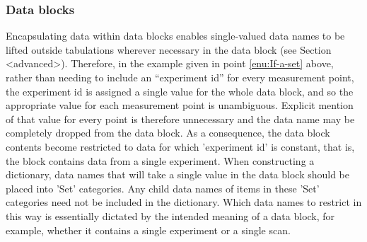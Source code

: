 \subsubsection{\label{subsec:Data-blocks}Data blocks}

Encapsulating data within data blocks enables single-valued data names
to be lifted outside tabulations wherever necessary in the data block
(see Section <advanced>). Therefore, in the example given in point
\ref{enu:If-a-set} above, rather than needing to include an ``experiment
id'' for every measurement point, the experiment id is assigned a
single value for the whole data block, and so the appropriate value
for each measurement point is unambiguous. Explicit mention of that
value for every point is therefore unnecessary and the data name may
be completely dropped from the data block. As a consequence, the data
block contents become restricted to data for which 'experiment id'
is constant, that is, the block contains data from a single experiment.
When constructing a dictionary, data names that will take a single
value in the data block should be placed into 'Set' categories. Any
child data names of items in these 'Set' categories need not be included
in the dictionary. Which data names to restrict in this way is essentially
dictated by the intended meaning of a data block, for example, whether
it contains a single experiment or a single scan.
